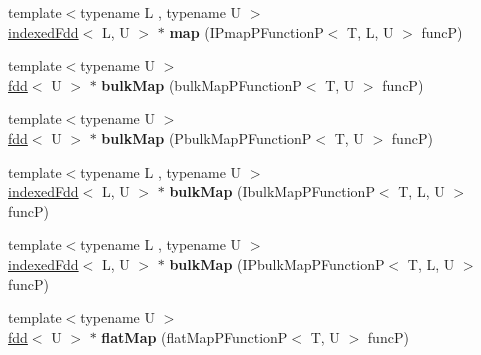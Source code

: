 \begin{DoxyCompactItemize}
\item 
\hypertarget{classfaster_1_1fdd_3_01T_01_5_01_4_ae2c6b56f97e260ada3f6115f7dc852ac}{}\label{classfaster_1_1fdd_3_01T_01_5_01_4_ae2c6b56f97e260ada3f6115f7dc852ac} 
{\footnotesize template$<$typename L , typename U $>$ }\\\hyperlink{classfaster_1_1indexedFdd}{indexed\+Fdd}$<$ L, U $>$ $\ast$ {\bfseries map} (I\+Pmap\+P\+FunctionP$<$ T, L, U $>$ funcP)
\item 
\hypertarget{classfaster_1_1fdd_3_01T_01_5_01_4_abbf7abb6ecd34cf25150dd10cbc1ad09}{}\label{classfaster_1_1fdd_3_01T_01_5_01_4_abbf7abb6ecd34cf25150dd10cbc1ad09} 
{\footnotesize template$<$typename U $>$ }\\\hyperlink{classfaster_1_1fdd}{fdd}$<$ U $>$ $\ast$ {\bfseries bulk\+Map} (bulk\+Map\+P\+FunctionP$<$ T, U $>$ funcP)
\item 
\hypertarget{classfaster_1_1fdd_3_01T_01_5_01_4_a25acd0d4b8ef01f7a60b17ff33024160}{}\label{classfaster_1_1fdd_3_01T_01_5_01_4_a25acd0d4b8ef01f7a60b17ff33024160} 
{\footnotesize template$<$typename U $>$ }\\\hyperlink{classfaster_1_1fdd}{fdd}$<$ U $>$ $\ast$ {\bfseries bulk\+Map} (Pbulk\+Map\+P\+FunctionP$<$ T, U $>$ funcP)
\item 
\hypertarget{classfaster_1_1fdd_3_01T_01_5_01_4_ae4d426d09264286ae02c1aa0bf9356e2}{}\label{classfaster_1_1fdd_3_01T_01_5_01_4_ae4d426d09264286ae02c1aa0bf9356e2} 
{\footnotesize template$<$typename L , typename U $>$ }\\\hyperlink{classfaster_1_1indexedFdd}{indexed\+Fdd}$<$ L, U $>$ $\ast$ {\bfseries bulk\+Map} (Ibulk\+Map\+P\+FunctionP$<$ T, L, U $>$ funcP)
\item 
\hypertarget{classfaster_1_1fdd_3_01T_01_5_01_4_ac83f6ce9ca84f55c4ad8dc2f8f0fcad7}{}\label{classfaster_1_1fdd_3_01T_01_5_01_4_ac83f6ce9ca84f55c4ad8dc2f8f0fcad7} 
{\footnotesize template$<$typename L , typename U $>$ }\\\hyperlink{classfaster_1_1indexedFdd}{indexed\+Fdd}$<$ L, U $>$ $\ast$ {\bfseries bulk\+Map} (I\+Pbulk\+Map\+P\+FunctionP$<$ T, L, U $>$ funcP)
\item 
\hypertarget{classfaster_1_1fdd_3_01T_01_5_01_4_af490d108ce1a30dc4210a1d8b557df97}{}\label{classfaster_1_1fdd_3_01T_01_5_01_4_af490d108ce1a30dc4210a1d8b557df97} 
{\footnotesize template$<$typename U $>$ }\\\hyperlink{classfaster_1_1fdd}{fdd}$<$ U $>$ $\ast$ {\bfseries flat\+Map} (flat\+Map\+P\+FunctionP$<$ T, U $>$ funcP)
\item 

\end{DoxyCompactItemize}
